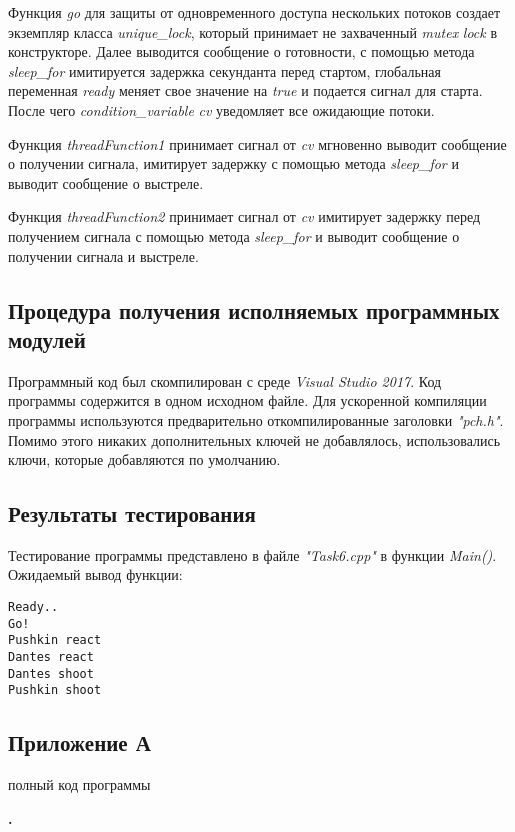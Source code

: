 \documentclass[a4paper,14pt]{article}
\begin{document}
Функция \textit{go} для защиты от одновременного доступа нескольких потоков создает экземпляр класса \textit{unique\_lock}, который принимает не захваченный \textit{mutex} \textit{lock} в конструкторе. Далее выводится сообщение о готовности, с помощью метода \textit{sleep\_for} имитируется задержка секунданта перед стартом, глобальная переменная \textit{ready} меняет свое значение на \textit{true} и подается сигнал для старта. После чего \textit{condition\_variable} \textit{cv} уведомляет все ожидающие потоки.

Функция \textit{threadFunction1} принимает сигнал от \textit{cv} мгновенно выводит сообщение о получении сигнала, имитирует задержку с помощью метода \textit{sleep\_for} и выводит сообщение о выстреле.

Функция \textit{threadFunction2} принимает сигнал от \textit{cv} имитирует задержку перед получением сигнала с помощью метода \textit{sleep\_for} и выводит сообщение о получении сигнала и выстреле.

\subsection{Процедура получения исполняемых программных модулей}
Программный код был скомпилирован с среде \textit{Visual Studio 2017}. Код программы содержится в одном исходном файле. Для ускоренной компиляции программы используются предварительно откомпилированные заголовки \textit{"pch.h"}. Помимо этого никаких дополнительных ключей не добавлялось, использовались ключи, которые добавляются по умолчанию.
\subsection{Результаты тестирования}
Тестирование программы представлено в файле \textit{"Task6.cpp"} в функции \textit{Main()}. Ожидаемый вывод функции:
\begin{verbatim}
Ready..
Go!
Pushkin react
Dantes react
Dantes shoot
Pushkin shoot
\end{verbatim}

\newpage
\setcounter{figure}{1} 
\setcounter{section}{1} 
\setcounter{subsection}{1} 

\begin{center}
	\section*{Приложение А}
	полный код программы
	
	\renewcommand{\subsection}{.\arabic{subsection}}
	\setcounter{subsection}{1} 
	\textbf{\subsection{  - Task6.cpp}}
	
	
\end{center}
\end{document}
